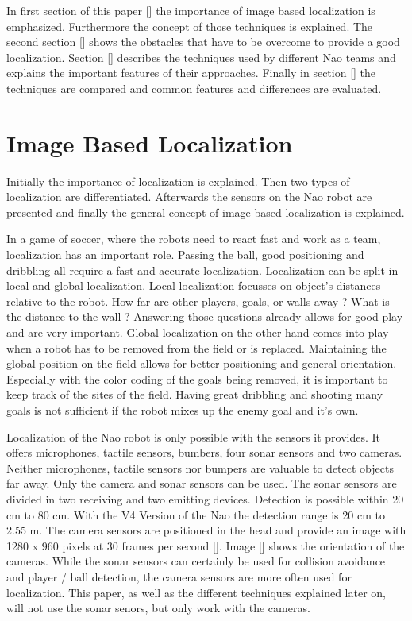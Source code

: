 \documentclass[12pt, a4paper]{scrartcl}
\begin{document}
  In first section of this paper [] the importance of image based localization is emphasized. Furthermore the concept of those techniques is explained. The second section [] shows the obstacles that have to be overcome to provide a good localization. Section [] describes the techniques used by different Nao teams and explains the important features of their approaches. Finally in section [] the techniques are compared and common features and differences are evaluated.


  \section{Image Based Localization}
  Initially the importance of localization is explained. Then two types of localization are differentiated. Afterwards the sensors on the Nao robot are presented and finally the general concept of image based localization is explained.

  In a game of soccer, where the robots need to react fast and work as a team, localization has an important role. Passing the ball, good positioning and dribbling all require a fast and accurate localization. Localization can be split in local and global localization. Local localization focusses on object's distances relative to the robot. How far are other players, goals, or walls away ? What is the distance to the wall ? Answering those questions already allows for good play and are very important. Global localization on the other hand comes into play when a robot has to be removed from the field or is replaced. Maintaining the global position on the field allows for better positioning and general orientation. Especially with the color coding of the goals being removed, it is important to keep track of the sites of the field. Having great dribbling and shooting many goals is not sufficient if the robot mixes up the enemy goal and it's own.

  Localization of the Nao robot is only possible with the sensors it provides. It offers microphones, tactile sensors, bumbers, four sonar sensors and two cameras. Neither microphones, tactile sensors nor bumpers are valuable to detect objects far away. Only the camera and sonar sensors can be used. The sonar sensors are divided in two receiving and two emitting devices. Detection is possible within 20 cm to 80 cm. With the V4 Version of the Nao the detection range is 20 cm to 2.55 m. The camera sensors are positioned in the head and provide an image with 1280 x 960 pixels at 30 frames per second []. Image [] shows the orientation of the cameras. While the sonar sensors can certainly be used for collision avoidance and player / ball detection, the camera sensors are more often used for localization. This paper, as well as the different techniques explained later on, will not use the sonar senors, but only work with the cameras.
\end{document}
